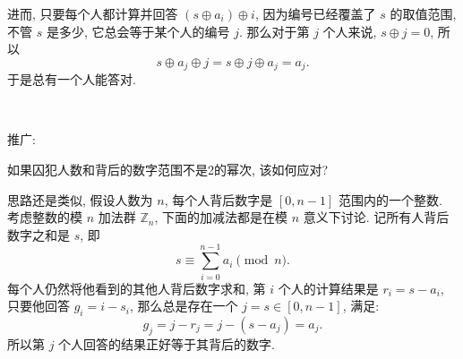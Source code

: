 进而, 只要每个人都计算并回答 $(s\oplus a_i) \oplus i$, 因为编号已经覆盖了 $s$ 的取值范围, 不管 $s$ 是多少, 它总会等于某个人的编号 $j$. 那么对于第 $j$ 个人来说, $s\oplus j = 0$, 所以
\[s\oplus a_j \oplus j = s\oplus j \oplus a_j = a_j .\]
于是总有一个人能答对.

~

\noindent 推广: 

如果囚犯人数和背后的数字范围不是2的幂次, 该如何应对?

思路还是类似, 假设人数为 $n$, 每个人背后数字是 $[0,n-1]$ 范围内的一个整数. 考虑整数的模 $n$ 加法群 $\mathbb{Z}_n$, 下面的加减法都是在模 $n$ 意义下讨论. 记所有人背后数字之和是 $s$, 即
\[s \equiv \sum_{i=0}^{n-1}a_i \pmod{n} .\] 
每个人仍然将他看到的其他人背后数字求和, 第 $i$ 个人的计算结果是 $r_i = s-a_i$, 只要他回答 $g_i = i-s_i$, 那么总是存在一个 $j=s\in[0,n-1]$, 满足:
\[g_j = j - r_j = j - (s - a_j) = a_j .\]
所以第 $j$ 个人回答的结果正好等于其背后的数字.

































